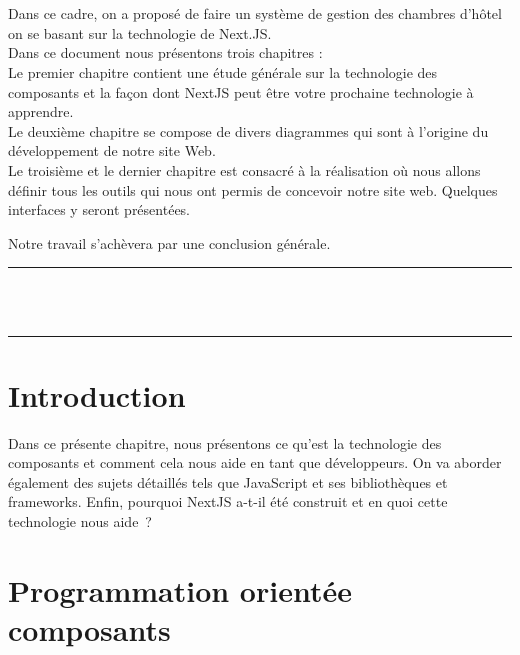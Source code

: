 \documentclass[12pt]{report}
\begin{document}
\\\\
Dans ce cadre, on a proposé de faire un système de gestion des chambres d’hôtel on se basant sur la technologie de Next.JS.
\\
Dans ce document nous présentons trois chapitres :
\\
Le premier chapitre contient une étude générale sur la technologie des composants et la façon dont NextJS peut être votre prochaine technologie à apprendre.
\\
Le deuxième chapitre se compose de divers diagrammes qui sont à l’origine du développement de notre site Web.
\\
Le troisième et le dernier chapitre est consacré à la réalisation où nous allons définir tous les outils qui nous ont permis de concevoir notre site web. Quelques interfaces y seront présentées.

Notre travail s’achèvera par une conclusion générale.

\newpage

\vspace*{\fill}
\begin{center}
    {\color{Blue} \rule{\linewidth}{1.2mm} }\\
\vspace{0.25in}
 {\centering{}}
\vspace{0.35in}\\
    {\color{Blue} \rule{\linewidth}{1.2mm} }
\end{center}
\vspace*{\fill}
\setcounter{section}{0}

\newpage

\section{Introduction}
\vspace{0.2in}
Dans ce présente chapitre, nous présentons ce qu’est la technologie des composants et comment cela nous aide en tant que développeurs. On va aborder également des sujets détaillés tels que JavaScript et ses bibliothèques et frameworks. Enfin, pourquoi NextJS a-t-il été construit et en quoi cette technologie nous aide ?

\section{Programmation orientée composants}
\end{document}
